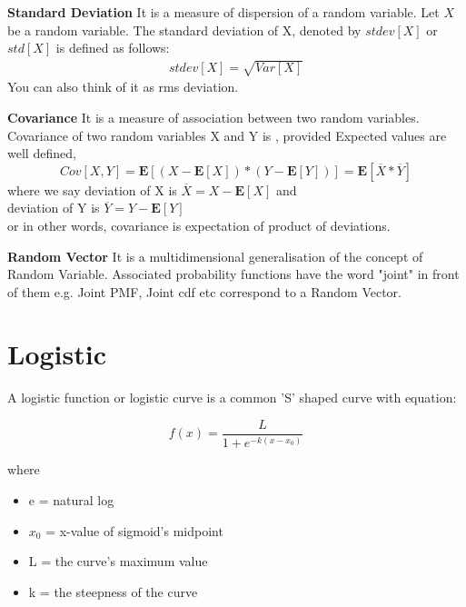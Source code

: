 \documentclass[10pt,a4paper]{article}
\begin{document}
	\begin{defn}{\textbf{Standard Deviation}}
	It is a measure of dispersion of a random variable. Let $X$ be a random variable. The standard deviation of X, denoted by $stdev[X]$ or $std[X]$ is defined as follows:\\
	\begin{align}
	stdev[X] = \sqrt{Var[X]}
	\end{align}
	You can also think of it as rms deviation.
	\end{defn}


	\begin{defn}{\textbf{Covariance}}
	It is a measure of association between two random variables.
	Covariance of two random variables X and Y is , provided Expected values are well defined,
	\begin{equation}
		Cov[X,Y] = \mathbf{E}[ (X - \mathbf{E}[X]) * (Y - \mathbf{E}[Y]) ] = \mathbf{E}[\overline{X} * \overline{Y}]
	\end{equation}
	where we say deviation of X is $\overline{X} = X - \mathbf{E}[X]$ and \\
	deviation of Y is $\overline{Y} = Y - \mathbf{E}[Y]$\\
	or in other words, covariance is expectation of product of deviations.
	\end{defn}

	\begin{defn}{\textbf{Random Vector}}
	It is a multidimensional generalisation of the concept of Random Variable. Associated probability functions have the word "joint" in front of them e.g. Joint PMF, Joint cdf etc correspond to a Random Vector.
	\end{defn}

	\section{Logistic}	
	A logistic function or logistic curve is a common 'S' shaped curve with equation:
	
	\begin{equation}
			f(x) = \frac{L}{1 + e^{-k(x-x_0)}}
	\end{equation}

	
	where
	\begin{itemize}
		\item e = natural log
		\item $x_0$ = x-value of sigmoid's midpoint
		\item L = the curve's maximum value
		\item k = the steepness of the curve
	\end{itemize}
\end{document}

